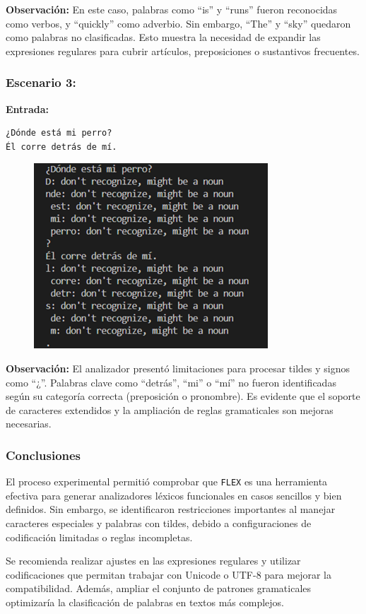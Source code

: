 \documentclass{article}
\begin{document}
\textbf{Observación:}  
En este caso, palabras como ``is'' y ``runs'' fueron reconocidas como verbos, y ``quickly'' como adverbio. Sin embargo, ``The'' y ``sky'' quedaron como palabras no clasificadas. Esto muestra la necesidad de expandir las expresiones regulares para cubrir artículos, preposiciones o sustantivos frecuentes.

\subsubsection{Escenario 3: }


\textbf{Entrada:}  
\begin{verbatim}
¿Dónde está mi perro?
Él corre detrás de mí.
\end{verbatim}

\begin{figure}[H]
    \centering
    \includegraphics[width=0.5\linewidth]{image6.png}
\end{figure}

\textbf{Observación:}  
El analizador presentó limitaciones para procesar tildes y signos como ``¿''. Palabras clave como ``detrás'', ``mi'' o ``mí'' no fueron identificadas según su categoría correcta (preposición o pronombre). Es evidente que el soporte de caracteres extendidos y la ampliación de reglas gramaticales son mejoras necesarias.

\subsubsection{Conclusiones}

El proceso experimental permitió comprobar que \texttt{FLEX} es una herramienta efectiva para generar analizadores léxicos funcionales en casos sencillos y bien definidos. Sin embargo, se identificaron restricciones importantes al manejar caracteres especiales y palabras con tildes, debido a configuraciones de codificación limitadas o reglas incompletas.

Se recomienda realizar ajustes en las expresiones regulares y utilizar codificaciones que permitan trabajar con Unicode o UTF-8 para mejorar la compatibilidad. Además, ampliar el conjunto de patrones gramaticales optimizaría la clasificación de palabras en textos más complejos.
\end{document}
